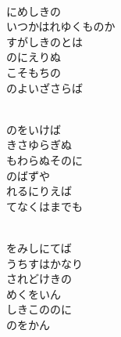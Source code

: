 \documentclass[10pt,b5j]{tarticle} %
\begin{document}
\vspace{1.5em} %
\newcommand{\linespace}{0.5em} %
\newcommand{\blocksize}{0.5\hsize} %
\newcommand{\itemmargin}{3em} %
\begin{enumerate} %
    \setlength{\itemindent}{\itemmargin} %
    \begin{minipage}[c]{\blocksize}
    
        \vspace{\linespace}
        \item~\\
        にめしきの\\
        いつかはれゆくものか\\
        すがしきのとは\\
        のにえりぬ\\
        こそもちの\\
        のよいざさらば
        
    \end{minipage}
    \begin{minipage}[c]{\blocksize}
        
        \vspace{\linespace}
        \item~\\
        のをいけば\\
        きさゆらぎぬ\\
        もわらぬそのに\\
        のばずや\\
        れるにりえば\\
        てなくはまでも
        
    \end{minipage}
    \begin{minipage}[c]{\blocksize}
        
        \vspace{\linespace}
        \item~\\
        をみしにてば\\
        うちすはかなり\\
        されどけきの\\
        めくをいん\\
        しきこののに\\
        のをかん
    
    \end{minipage}
\end{enumerate} %
\end{document}
